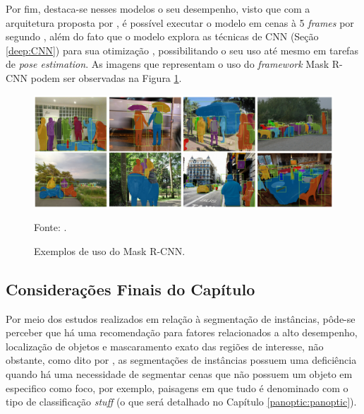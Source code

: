 Por fim, destaca-se nesses modelos o seu desempenho, visto que com a arquitetura proposta por \cite{He2020}, é possível executar o modelo em cenas à 5 \textit{frames} por segundo \cite{Minaee2021, He2020, Hafiz2020}, além do fato que o modelo explora as técnicas de CNN (Seção \ref{deep:CNN}) para sua otimização \cite{Li2020}, possibilitando o seu uso até mesmo em tarefas de \textit{pose estimation}. As imagens que representam o uso do \textit{framework} Mask R-CNN podem ser observadas na Figura \ref{instance:fig:3}.

\begin{figure}[H]
    \centering
    \caption{Exemplos de uso do Mask R-CNN.}
    \includegraphics[width=1\textwidth]{recursos/imagens/instance/insta_examp.png}
    \label{instance:fig:3}

    \vspace*{1 cm}
    Fonte: \cite{He2020}.
\end{figure}


\subsection{Considerações Finais do Capítulo}
\label{instance:conclusion}

Por meio dos estudos realizados em relação à segmentação de instâncias, pôde-se perceber que há uma recomendação para fatores relacionados a alto desempenho, localização de objetos e mascaramento exato das regiões de interesse, não obstante, como dito por \cite{Kirillov2019a}, as segmentações de instâncias possuem uma deficiência quando há uma necessidade de segmentar cenas que não possuem um objeto em especifico como foco, por exemplo, paisagens em que tudo é denominado com o tipo de classificação \textit{stuff} (o que será detalhado no Capítulo \ref{panoptic:panoptic}).